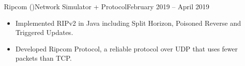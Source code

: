 \begin{cvsubsection}{Ripcom \normalfont(\href{ https://github.com/a3y3/Ripcom}{})}{Network Simulator + Protocol}{February 2019 -- April 2019}
	\begin{itemize}
        \item Implemented RIPv2 in Java including Split Horizon, Poisoned Reverse and Triggered Updates.
        \item Developed Ripcom Protocol, a reliable protocol over UDP that uses fewer packets than TCP.
	\end{itemize}
\end{cvsubsection}
